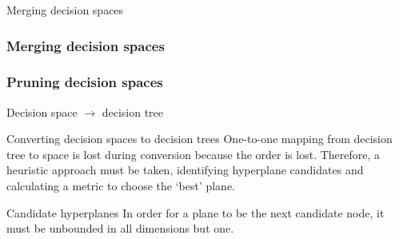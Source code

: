 \documentclass[english]{beamer}
\begin{document}
\begin{frame}{Merging decision spaces}
	\frametitle<1>{Merging decision spaces}
	\frametitle<3>{Pruning decision spaces}
\end{frame}


\begin{frame}{Decision space $\rightarrow$ decision tree}
	\begin{block}{Converting decision spaces to decision trees}
		One-to-one mapping from decision tree to space is lost during conversion because the order is lost. Therefore, a heuristic approach must be taken, identifying hyperplane candidates and calculating a metric to choose the `best' plane.
	\end{block}
	
	
	\begin{block}{Candidate hyperplanes}
		In order for a plane to be the next candidate node, it must be unbounded in all dimensions but one.
	\end{block}
\end{frame}
\end{document}
